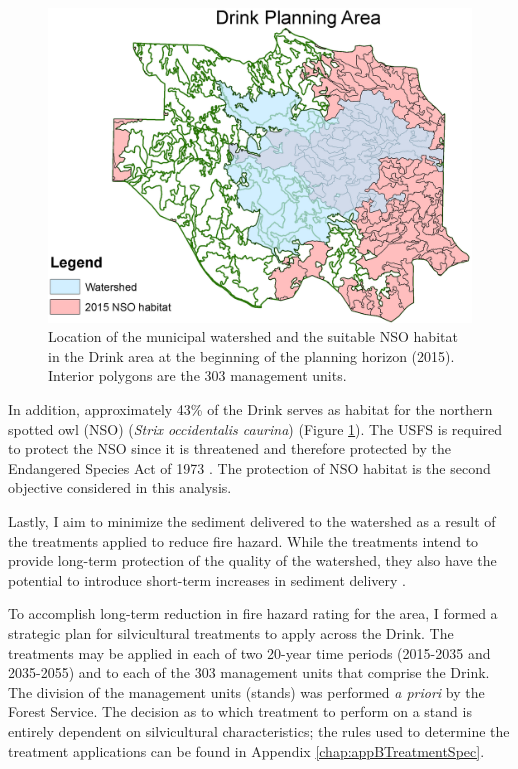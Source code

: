 \begin{figure}
\centering
\includegraphics[width=.5\textwidth]{../images/DrinkMap_NSOAndWatershed}
\caption[NSO Habitat and municipal watershed in the Drink Area]{Location of the municipal watershed and the suitable NSO habitat in the Drink area at the beginning of the planning horizon (2015). Interior polygons are the 303 management units.}
\label{fig:drinkOwlAndWatershed}
\end{figure}

In addition, approximately 43\% of the Drink serves as habitat for the northern spotted owl (NSO) (\textit{Strix occidentalis caurina}) (Figure \ref{fig:drinkOwlAndWatershed}). The USFS is required to protect the NSO since it is threatened and therefore protected by the Endangered Species Act of 1973 \cite{congress1973endangered}. The protection of NSO habitat is the second objective considered in this analysis.

Lastly, I aim to minimize the sediment delivered to the watershed as a result of the treatments applied to reduce fire hazard. While the treatments intend to provide long-term protection of the quality of the watershed, they also have the potential to introduce short-term increases in sediment delivery \cite{o2005conceptual}.

To accomplish long-term reduction in fire hazard rating for the area, I formed a strategic plan for silvicultural treatments to apply across the Drink. The treatments may be applied in each of two 20-year time periods (2015-2035 and 2035-2055) and to each of the 303 management units that comprise the Drink. The division of the management units (stands) was performed \textit{a priori} by the Forest Service. The decision as to which treatment to perform on a stand is entirely dependent on silvicultural characteristics; the rules used to determine the treatment applications can be found in Appendix \ref{chap:appBTreatmentSpec}.

